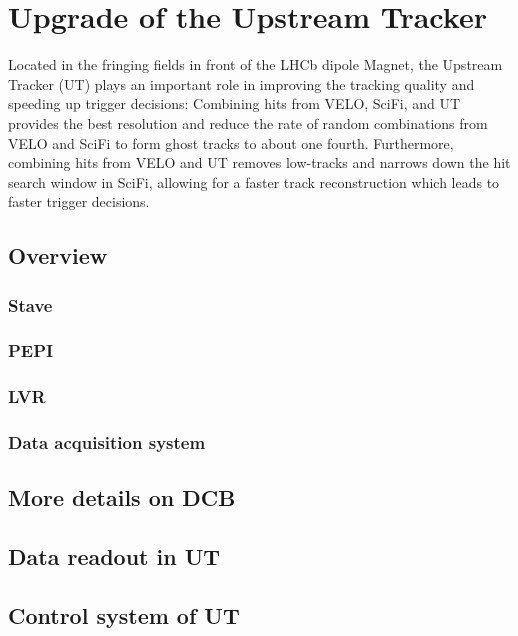 \chapter{Upgrade of the Upstream Tracker}
\label{ref:ut}

Located in the fringing fields in front of the LHCb dipole Magnet,
the Upstream Tracker (UT) plays an important role in improving the tracking
quality and speeding up trigger decisions:
Combining hits from VELO, SciFi, and UT provides the best \pt resolution
and reduce the rate of random combinations from VELO and SciFi to form
ghost tracks to about one fourth.
Furthermore, combining hits from VELO and UT removes low-\pt tracks and narrows
down the hit search window in SciFi, allowing for a faster track reconstruction
which leads to faster trigger decisions.


\section{Overview}
\label{ref:ut:overview}

\subsection{Stave}

\subsection{PEPI}

\subsection{LVR}

\subsection{Data acquisition system}


\section{More details on DCB}


\section{Data readout in UT}


\section{Control system of UT}
